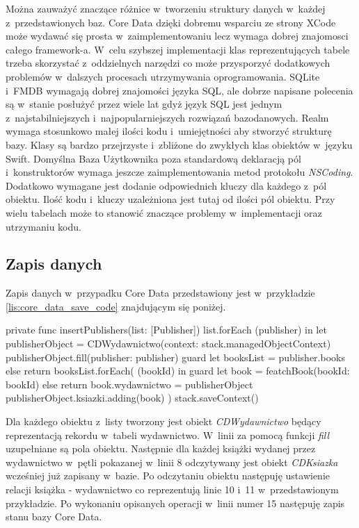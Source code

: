 Można zauważyć znaczące różnice w~tworzeniu struktury danych w~każdej z~przedstawionych baz. Core Data dzięki dobremu wsparciu ze strony XCode może wydawać się prosta w~zaimplementowaniu lecz wymaga dobrej znajomosci całego framework-a. W~celu szybszej implementacji klas reprezentujących tabele trzeba skorzystać z~oddzielnych narzędzi co może przysporzyć dodatkowych problemów w~dalszych procesach utrzymywania oprogramowania. SQLite i~FMDB wymagają dobrej znajomości języka SQL, ale dobrze napisane polecenia są w~stanie posłużyć przez wiele lat gdyż język SQL jest jednym z~najstabilniejszych i~najpopularniejszych rozwiązań bazodanowych. Realm wymaga stosunkowo małej ilości kodu i~umiejętności aby stworzyć strukturę bazy. Klasy są bardzo przejrzyste i~zbliżone do zwykłych klas obiektów w~języku Swift. Domyślna Baza Użytkownika poza standardową deklaracją pól i~konstruktorów wymaga jeszcze zaimplementowania metod protokołu \textit{NSCoding}. Dodatkowo wymagane jest dodanie odpowiednich kluczy dla każdego z~pól obiektu. Ilość kodu i~kluczy uzależniona jest tutaj od ilości pól obiektu. Przy wielu tabelach może to stanowić znaczące problemy w~implementacji oraz utrzymaniu kodu. 

\subsection{Zapis danych}

Zapis danych w~przypadku Core Data przedstawiony jest w~przykładzie \ref{lis:core_data_save_code} znajdującym się poniżej.

\begin{code}[
		language=swift,
		caption={Przykład zapisu obiektu Core Data},
		label={lis:core_data_save_code},
	]
    private func insertPublishers(list: [Publisher]) {
        list.forEach { (publisher) in
            let publisherObject = CDWydawnictwo(context: stack.managedObjectContext)
            publisherObject.fill(publisher: publisher)
            guard let booksList = publisher.books else { return }
            booksList.forEach({ (bookId) in
                guard let book = featchBook(bookId: bookId) else { return }
                book.wydawnictwo = publisherObject
                publisherObject.ksiazki.adding(book)
            })
        }
        stack.saveContext()
    }
\end{code}

Dla każdego obiektu z~listy tworzony jest obiekt \textit{CDWydawnictwo} będący reprezentacją rekordu w~tabeli wydawnictwo. W~linii za pomocą funkcji \textit{fill} uzupełniane są pola obiektu. Następnie dla każdej książki wydanej przez wydawnictwo w~pętli pokazanej w~linii 8 odczytywany jest obiekt \textit{CDKsiazka} wcześniej już zapisany w~bazie. Po odczytaniu obiektu następuję ustawienie relacji książka - wydawnictwo co reprezentują linie 10 i~11 w~przedstawionym przykładzie. Po wykonaniu opisanych operacji w~linii numer 15 następuję zapis stanu bazy Core Data. 

